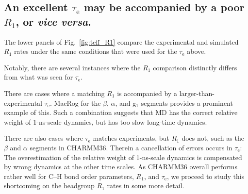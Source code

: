 \documentclass[journal=jcisd8,manuscript=article,layout=twocolumn]{achemso}
\begin{document}
\subsection*{An excellent $\tau_\mathrm e$ may be accompanied by a poor $R_1$, or \emph{vice versa}.}
The lower panels of Fig.~\ref{fig:teff_R1} compare the experimental and simulated $R_{1}$ rates under the same conditions that were used for the $\tau_\mathrm{e}$ above.
%

%
Notably, there are several instances where the $R_1$ comparison distinctly differs from what was seen for $\tau_\mathrm{e}$.

There are cases where
a matching $R_{1}$ is accompanied by a larger-than-experimental $\tau_\mathrm{e}$.
MacRog for the $\beta$, $\alpha$, and g$_1$ segments provides a prominent example
of this.
Such a combination suggests that MD has the correct relative weight of 1-ns-scale dynamics, but has too slow long-time dynamics.

There are also cases
where $\tau_\mathrm{e}$ matches experiments, but $R_1$ does not, such as
the $\beta$ and $\alpha$ segments in CHARMM36.
Therein a cancellation of errors occurs in $\tau_\mathrm{e}$: The
overestimation of the relative weight of
1-ns-scale dynamics is compensated by wrong dynamics at the other time scales.
As CHARMM36 overall performs rather well for C--H bond order parameters, $R_1$, and $\tau_\mathrm{e}$,
we proceed to study this shortcoming on the headgroup $R_1$ rates
in some more detail.
%
\end{document}
